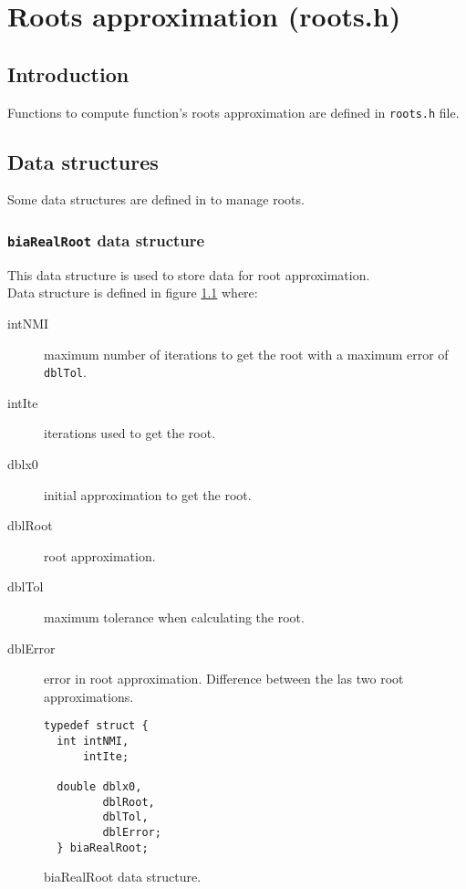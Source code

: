 %
%

\chapter{Roots approximation (roots.h)} \label{sec:roots}

\section{Introduction}

Functions to compute function's roots approximation are defined in \texttt{roots.h} file.

\section{Data structures}

Some data structures are defined in \BI to manage roots.

\subsection{\texttt{biaRealRoot} data structure} \label{sec:biaRealRoot}

This data structure is used to store data for root approximation.\\

Data structure is defined in figure \ref{fig:biaRealRoot} where:
%
\begin{description}
\item[intNMI] maximum number of iterations to get the root with a maximum error of \texttt{dblTol}.
\item[intIte] iterations used to get the root.
\item[dblx0] initial approximation to get the root.
\item[dblRoot] root approximation.
\item[dblTol] maximum tolerance when calculating the root.
\item[dblError] error in root approximation. Difference between the las two root approximations.
\end{description}
%
\begin{figure}[!h]
\begin{verbatim}
typedef struct {
  int intNMI,
      intIte;

  double dblx0,
         dblRoot,
         dblTol,
         dblError;
  } biaRealRoot;
\end{verbatim}
\caption{biaRealRoot data structure.} \label{fig:biaRealRoot}
\end{figure}

